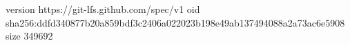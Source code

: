 version https://git-lfs.github.com/spec/v1
oid sha256:ddfd340877b20a859bdf3c2406a022023b198e49ab137494088a2a73ac6e5908
size 349692
